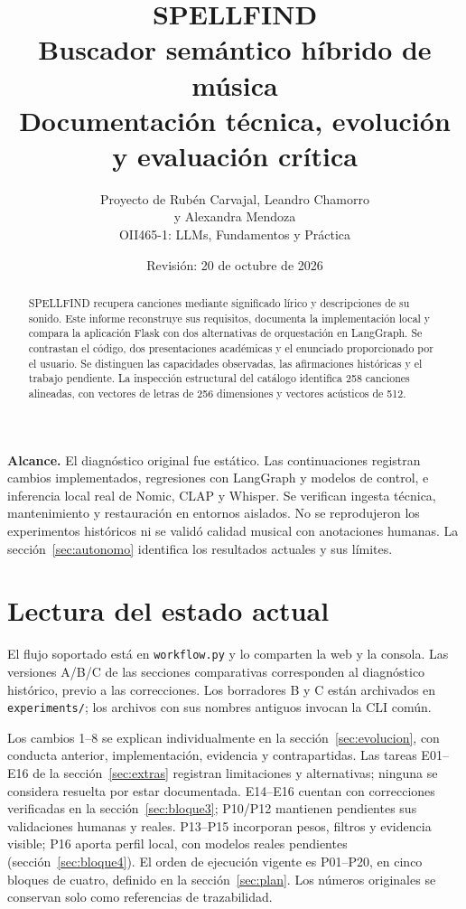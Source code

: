 \documentclass[11pt,a4paper]{article}
\title{\Huge\textcolor{accent}{SPELLFIND}\\[8pt]\Large Buscador semántico híbrido de música\\[12pt]\large Documentación técnica, evolución y evaluación crítica}
\author{Proyecto de Rubén Carvajal, Leandro Chamorro\\y Alexandra Mendoza\\[6pt]\small OII465-1: LLMs, Fundamentos y Práctica}
\date{Revisión: 20 de octubre de 2026}
\newcommand{\code}[1]{\nolinkurl{#1}}
\begin{document}
\maketitle
\begin{abstract}
SPELLFIND recupera canciones mediante significado lírico y descripciones de su sonido. Este informe reconstruye sus requisitos, documenta la implementación local y compara la aplicación Flask con dos alternativas de orquestación en LangGraph. Se contrastan el código, dos presentaciones académicas y el enunciado proporcionado por el usuario. Se distinguen las capacidades observadas, las afirmaciones históricas y el trabajo pendiente. La inspección estructural del catálogo identifica 258 canciones alineadas, con vectores de letras de 256 dimensiones y vectores acústicos de 512.
\end{abstract}
\vfill
\textbf{Alcance.} El diagnóstico original fue estático. Las continuaciones registran cambios implementados, regresiones con LangGraph y modelos de control, e inferencia local real de Nomic, CLAP y Whisper. Se verifican ingesta técnica, mantenimiento y restauración en entornos aislados. No se reprodujeron los experimentos históricos ni se validó calidad musical con anotaciones humanas. La sección~\ref{sec:autonomo} identifica los resultados actuales y sus límites.
\newpage
\tableofcontents
\newpage

\section*{Lectura del estado actual}
El flujo soportado está en \code{workflow.py} y lo comparten la web y la consola.
Las versiones A/B/C de las secciones comparativas corresponden al diagnóstico
histórico, previo a las correcciones. Los borradores B y C están archivados en
\code{experiments/}; los archivos con sus nombres antiguos invocan la CLI común.

Los cambios 1--8 se explican individualmente en la sección~\ref{sec:evolucion},
con conducta anterior, implementación, evidencia y contrapartidas. Las tareas
E01--E16 de la sección~\ref{sec:extras} registran limitaciones y alternativas;
ninguna se considera resuelta por estar documentada. E14--E16 cuentan con
correcciones verificadas en la sección~\ref{sec:bloque3}; P10/P12 mantienen
pendientes sus validaciones humanas y reales. P13--P15 incorporan pesos, filtros
y evidencia visible; P16 aporta perfil local, con modelos reales pendientes
(sección~\ref{sec:bloque4}). El orden de ejecución vigente es P01--P20, en cinco bloques de cuatro,
definido en la sección~\ref{sec:plan}. Los números originales se conservan
solo como referencias de trazabilidad.
\end{document}
